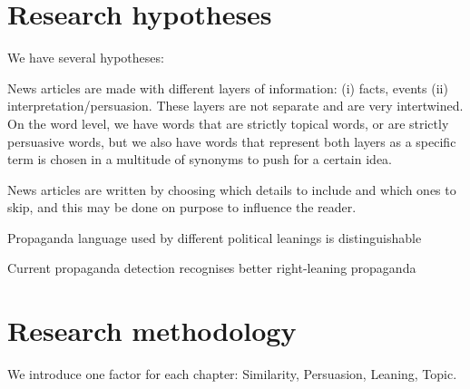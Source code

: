 


\section{Research hypotheses}
\label{sec:intro_hyp}

We have several hypotheses:

News articles are made with different layers of information: (i) facts, events (ii) interpretation/persuasion.
These layers are not separate and are very intertwined. On the word level, we have words that are strictly topical words, or are strictly persuasive words, but we also have words that represent both layers as a specific term is chosen in a multitude of synonyms to push for a certain idea.

News articles are written by choosing which details to include and which ones to skip, and this may be done on purpose to influence the reader.

Propaganda language used by different political leanings is distinguishable

Current propaganda detection recognises better right-leaning propaganda

\section{Research methodology}
\label{sec:intro_method}

We introduce one factor for each chapter: Similarity, Persuasion, Leaning, Topic.

